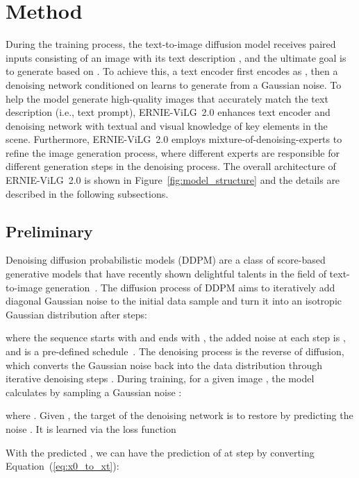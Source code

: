 \documentclass[10pt,twocolumn,letterpaper]{article}
\begin{document}
\section{Method}

During the training process, the text-to-image diffusion model receives paired inputs  consisting of an image  with its text description , and the ultimate goal is to generate  based on .
To achieve this, a text encoder  first encodes  as , then a denoising network  conditioned on  learns to generate  from a Gaussian noise.
To help the model generate high-quality images that accurately match the text description (i.e., text prompt), ERNIE-ViLG~2.0 enhances text encoder  and denoising network  with textual and visual knowledge of key elements in the scene.
Furthermore, ERNIE-ViLG~2.0 employs mixture-of-denoising-experts to refine the image generation process, where different experts are responsible for different generation steps in the denoising process.
The overall architecture of ERNIE-ViLG~2.0 is shown in Figure~\ref{fig:model_structure} and the details are described in the following subsections.




\subsection{Preliminary}
\label{sec:preliminary}


Denoising diffusion probabilistic models (DDPM) are a class of score-based generative models that have recently shown delightful talents in the field of text-to-image generation~\cite{DBLP:conf/nips/HoJA20}.
The diffusion process of DDPM aims to iteratively add diagonal Gaussian noise to the initial data sample  and turn it into an isotropic Gaussian distribution after  steps:

where the sequence  starts with  and ends with , the added noise at each step is , and  is a pre-defined schedule~\cite{DBLP:conf/icml/Sohl-DicksteinW15,DBLP:conf/iclr/0011SKKEP21}.
The denoising process is the reverse of diffusion, which converts the Gaussian noise  back into the data distribution  through iterative denoising steps . 
During training, for a given image , the model calculates  by sampling a Gaussian noise :

where . Given , the target of the denoising network  is to restore  by predicting the noise . It is learned via the loss function


With the predicted , we can have the prediction of  at step  by converting Equation~(\ref{eq:x0_to_xt}):
\end{document}

